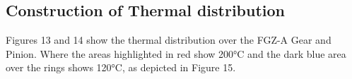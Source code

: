 \subsection{Construction of Thermal distribution}
Figures 13 and 14 show the thermal distribution over the FGZ-A Gear and Pinion. Where the areas highlighted in red show 200°C and the dark blue area over the rings shows 120°C, as depicted in Figure 15. 